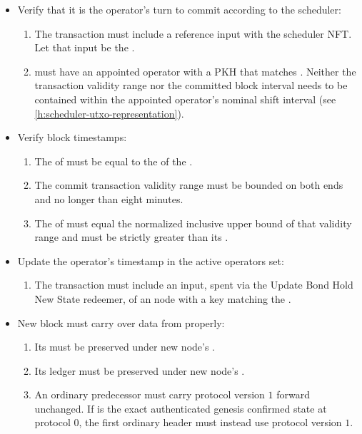 \documentclass[../midgard.tex]{subfiles}
\begin{document}
\begin{description}
\begin{itemize}
            \item Verify that it is the operator's turn to commit according to the scheduler:
            \begin{enumerate}[resume]
                \item The transaction must include a reference input with the scheduler NFT.
                  Let that input be the .
                \item {} must have an appointed operator with a PKH that matches .
                  Neither the transaction validity range nor the committed block interval needs to be contained within the appointed operator's nominal shift interval (see \cref{h:scheduler-utxo-representation}).
            \end{enumerate}

            \item Verify block timestamps:
            \begin{enumerate}[resume]
                \item The  of  must be equal to the  of the .
                \item The commit transaction validity range must be bounded on both ends and no longer than eight minutes.
                \item The  of  must equal the normalized inclusive upper bound of that validity range and must be strictly greater than its .
            \end{enumerate}
            
            \item Update the operator's timestamp in the active operators set:
            \begin{enumerate}[resume]
                \item The transaction must include an input, spent via the Update Bond Hold New State redeemer, of an  node with a key matching the .
            \end{enumerate}
            \item New block must carry over data from  properly:
                \begin{enumerate}[resume]
                  \item Its  must be preserved under new node's .
                  \item Its ledger must be preserved under new node's .
                  \item An ordinary predecessor must carry protocol version \(1\) forward unchanged.
                    If  is the exact authenticated genesis confirmed state at protocol \(0\), the first ordinary header must instead use protocol version \(1\).
                \end{enumerate}
        \end{itemize}


\end{description}
\end{document}
